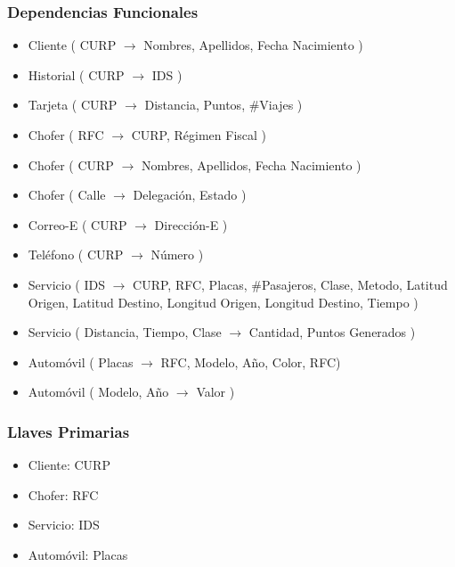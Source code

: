 \documentclass{article}
\begin{document}
       { \noindent
         \subsubsection*{Dependencias Funcionales}
           \begin{itemize}
           \item Cliente ( CURP $\rightarrow$ Nombres, Apellidos, Fecha Nacimiento )
             
           \item Historial ( CURP $\rightarrow$ IDS )
             
           \item Tarjeta ( CURP $\rightarrow$ Distancia, Puntos, $\#$Viajes )
             
           \item Chofer ( RFC $\rightarrow$ CURP, Régimen Fiscal )
           \item Chofer ( CURP $\rightarrow$ Nombres, Apellidos, Fecha Nacimiento )
           \item Chofer ( Calle $\rightarrow$ Delegación, Estado )

           \item Correo-E ( CURP $\rightarrow$ Dirección-E )

           \item Teléfono ( CURP $\rightarrow$ Número )
             
           \item Servicio ( IDS  $\rightarrow$ CURP, RFC, Placas, $\#$Pasajeros, Clase, Metodo,
             Latitud Origen, Latitud Destino, Longitud Origen, Longitud Destino, Tiempo )
           \item Servicio ( Distancia, Tiempo, Clase $\rightarrow$ Cantidad, Puntos Generados )

           \item Automóvil ( Placas $\rightarrow$ RFC, Modelo, Año, Color, RFC)
           \item Automóvil ( Modelo, Año $\rightarrow$ Valor )
             
           \end{itemize}
       }

       { \noindent
         \subsubsection*{Llaves Primarias}
         \begin{multicols}{4}
           \begin{itemize}
           \item Cliente: CURP
           \item Chofer: RFC
           \item Servicio: IDS
           \item Automóvil: Placas
           \end{itemize}
         \end{multicols}
       }
       
\end{document}
